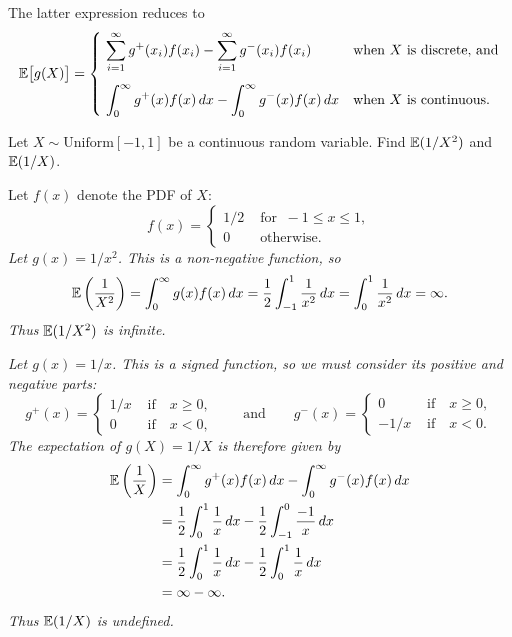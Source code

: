 The latter expression reduces to
\[
\mathbb{E}\big[g(X)\big] = \begin{cases}
	\ \displaystyle\sum_{i=1}^{\infty} g^{+}(x_i) f(x_i) - \sum_{i=1}^{\infty} g^{-}(x_i) f(x_i)	\qquad\mbox{} & \text{when $X$ is discrete, and} \\[4ex]
	\ \displaystyle\int_0^{\infty} g^{+}(x)f(x)\,dx - \displaystyle\int_0^{\infty} g^{-}(x)f(x)\,dx	& \text{when $X$ is continuous.}
\end{cases}
\]

\begin{example}
Let $X\sim\text{Uniform}[-1,1]$ be a continuous random variable. Find $\mathbb{E}(1/X^2)$ and $\mathbb{E}(1/X)$.
\end{example}

\begin{solution}
Let $f(x)$ denote the PDF of $X$:
\[
f(x) = \begin{cases}
	1/2 & \text{ for }\ -1\leq x\leq 1, \\
	0	& \text{ otherwise.}
\end{cases}	
\]
\ben
\it Let $g(x) = 1/x^2$. This is a non-negative function, so
\begin{align*}
\mathbb{E}\left(\frac{1}{X^2}\right) 
	= \int_{0}^{\infty} g(x)f(x)\,dx 
	= \frac{1}{2}\int_{-1}^{1} \frac{1}{x^2}\,dx
	= \int_{0}^{1}\frac{1}{x^2}\,dx
	= \infty.
\end{align*}
Thus $\mathbb{E}(1/X^2)$ is infinite.

\it Let $g(x) = 1/x$. This is a signed function, so we must consider its positive and negative parts:
\[
g^{+}(x)	= \begin{cases}  1/x & \text{ if}\quad x\geq 0, \\ 0 & \text{ if}\quad x < 0,\end{cases}
\qquad\text{and}\qquad
g^{-}(x)	= \begin{cases}  0 & \text{ if}\quad x\geq 0, \\ -1/x & \text{ if}\quad x < 0.\end{cases}
\]
The expectation of $g(X)=1/X$ is therefore given by
\begin{align*}
\mathbb{E}\left(\frac{1}{X}\right)
	& = \int_{0}^{\infty} g^{+}(x)f(x)\,dx - \int_{0}^{\infty} g^{-}(x) f(x)\,dx \\
	& = \frac{1}{2}\int_0^1 \frac{1}{x}\,dx - \frac{1}{2}\int_{-1}^0 \frac{-1}{x}\,dx \\
	& = \frac{1}{2}\int_0^1 \frac{1}{x}\,dx - \frac{1}{2}\int_{0}^{1} \frac{1}{x}\,dx \\
	& = \infty - \infty.
\end{align*}
Thus $\mathbb{E}(1/X)$ is undefined.
\een
%
\end{solution}
